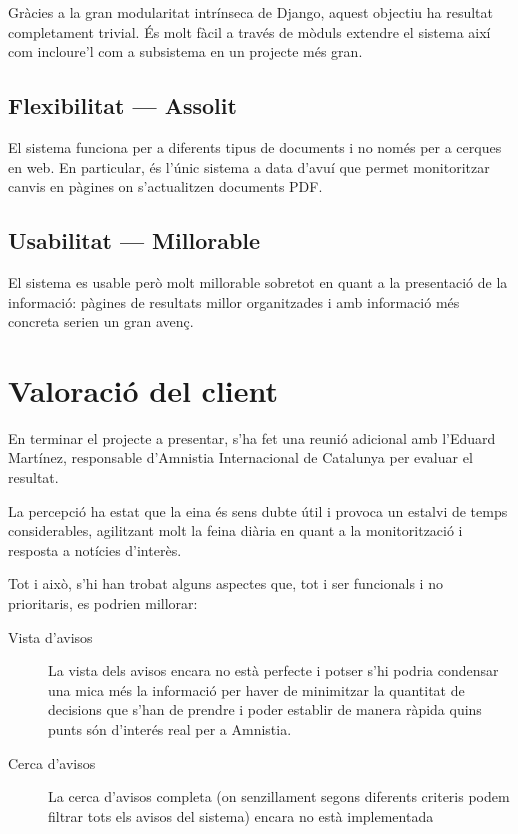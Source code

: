 \documentclass{article}
\begin{document}
Gràcies a la gran modularitat intrínseca de Django, aquest objectiu ha resultat completament trivial. És molt fàcil a través de mòduls extendre el sistema així com incloure'l com a subsistema en un projecte més gran.

\subsection{Flexibilitat --- Assolit}

El sistema funciona per a diferents tipus de documents i no només per a cerques en web. En particular, és l'únic sistema a data d'avuí que permet monitoritzar canvis en pàgines on s'actualitzen documents PDF\@.


\subsection{Usabilitat --- Millorable}

El sistema es usable però molt millorable sobretot en quant a la presentació de la informació: pàgines de resultats millor organitzades i amb informació més concreta serien un gran avenç.


\newpage

\section{Valoració del client}

En terminar el projecte a presentar, s'ha fet una reunió adicional amb l'Eduard Martínez, responsable d'Amnistia Internacional de Catalunya per evaluar el resultat.

La percepció ha estat que la eina és sens dubte útil i provoca un estalvi de temps considerables, agilitzant molt la feina diària en quant a la monitorització i resposta a notícies d'interès.

Tot i això, s'hi han trobat alguns aspectes que, tot i ser funcionals i no prioritaris, es podrien millorar:

\begin{description}
    \item[Vista d'avisos] La vista dels avisos encara no està perfecte i potser s'hi podria condensar una mica més la informació per haver de minimitzar la quantitat de decisions que s'han de prendre i poder establir de manera ràpida quins punts són d'interés real per a Amnistia.
    \item[Cerca d'avisos] La cerca d'avisos completa (on senzillament segons diferents criteris podem filtrar tots els avisos del sistema) encara no està implementada
\end{description}
\end{document}
